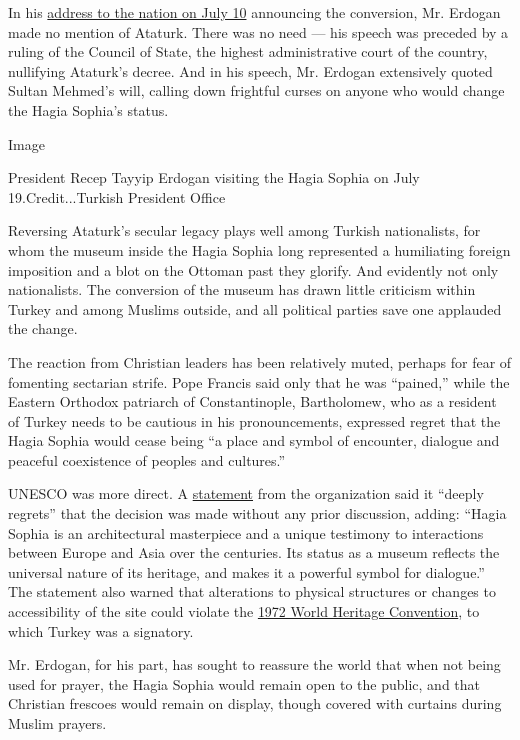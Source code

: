 In his
\href{https://www.nytimes3xbfgragh.onion/2020/07/10/world/europe/hagia-sophia-erdogan.html}{address
to the nation on July 10} announcing the conversion, Mr. Erdogan made no
mention of Ataturk. There was no need --- his speech was preceded by a
ruling of the Council of State, the highest administrative court of the
country, nullifying Ataturk's decree. And in his speech, Mr. Erdogan
extensively quoted Sultan Mehmed's will, calling down frightful curses
on anyone who would change the Hagia Sophia's status.

Image

President Recep Tayyip Erdogan visiting the Hagia Sophia on July
19.Credit...Turkish President Office

Reversing Ataturk's secular legacy plays well among Turkish
nationalists, for whom the museum inside the Hagia Sophia long
represented a humiliating foreign imposition and a blot on the Ottoman
past they glorify. And evidently not only nationalists. The conversion
of the museum has drawn little criticism within Turkey and among Muslims
outside, and all political parties save one applauded the change.

The reaction from Christian leaders has been relatively muted, perhaps
for fear of fomenting sectarian strife. Pope Francis said only that he
was ``pained,'' while the Eastern Orthodox patriarch of Constantinople,
Bartholomew, who as a resident of Turkey needs to be cautious in his
pronouncements, expressed regret that the Hagia Sophia would cease being
``a place and symbol of encounter, dialogue and peaceful coexistence of
peoples and cultures.''

UNESCO was more direct. A
\href{https://en.unesco.org/news/unesco-statement-hagia-sophia-istanbul}{statement}
from the organization said it ``deeply regrets'' that the decision was
made without any prior discussion, adding: ``Hagia Sophia is an
architectural masterpiece and a unique testimony to interactions between
Europe and Asia over the centuries. Its status as a museum reflects the
universal nature of its heritage, and makes it a powerful symbol for
dialogue.'' The statement also warned that alterations to physical
structures or changes to accessibility of the site could violate the
\href{https://whc.unesco.org/en/statesparties/}{1972 World Heritage
Convention}, to which Turkey was a signatory.

Mr. Erdogan, for his part, has sought to reassure the world that when
not being used for prayer, the Hagia Sophia would remain open to the
public, and that Christian frescoes would remain on display, though
covered with curtains during Muslim prayers.

